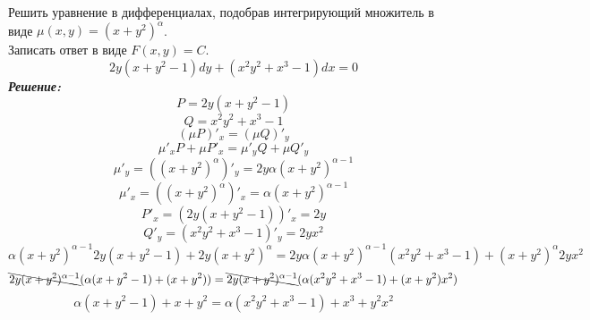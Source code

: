 \documentclass[a5paper, 10pt]{article}
\theoremstyle{definition}
\theoremstyle{plain}
\theoremstyle{remark}
\begin{document}
\newpage
\section{}
Решить уравнение в дифференциалах, подобрав интегрирующий множитель в виде $\mu (x, y) = (x+y^2)^{\alpha}$.\\
Записать ответ в виде $F(x, y) = C$.
\begin{equation*}
2y(x + y^2 - 1) dy + (x^2y^2+x^3 - 1)dx = 0
\end{equation*}
\textit{\textbf{Решение:}}\\
\begin{equation*}
P = 2y(x + y^2 - 1) 
\end{equation*}
\begin{equation*}
Q = x^2y^2+x^3 - 1
\end{equation*}
\begin{equation*}
\left( \mu P \right)'_x = \left( \mu Q \right)'_y
\end{equation*}
\begin{equation*}
 \mu'_x P + \mu P'_x = \mu'_y Q  +  \mu Q'_y
\end{equation*}
\begin{equation*}
 \mu'_y =  \left(  (x+y^2)^{\alpha} \right)'_y  = 2y{\alpha} (x+y^2)^{\alpha - 1}
\end{equation*}
\begin{equation*}
 \mu'_x =  \left(  (x+y^2)^{\alpha} \right)'_x  = {\alpha} (x+y^2)^{\alpha - 1}
\end{equation*}
\begin{equation*}
 P'_x =  \left(  2y(x + y^2 - 1)  \right)'_x = 2y
\end{equation*}
\begin{equation*}
 Q'_y=  \left(  x^2y^2+x^3 - 1  \right)'_y = 2yx^2
\end{equation*}
\begin{equation*}
  {\alpha} (x+y^2)^{\alpha - 1}  2y(x + y^2 - 1) + 2y(x+y^2)^{\alpha}  = 2y{\alpha} (x+y^2)^{\alpha - 1} ( x^2y^2+x^3 - 1)  +  (x+y^2)^{\alpha}  2yx^2
\end{equation*}
\begin{equation*}
 \bcancel{ 2y (x+y^2)^{\alpha - 1}} ( {\alpha}(x + y^2 - 1) +(x+y^2)) =  \bcancel{ 2y (x+y^2)^{\alpha - 1}}({\alpha} ( x^2y^2+x^3 - 1)  +  (x+y^2)x^2)
\end{equation*}
\begin{equation*}
  {\alpha}(x + y^2 - 1) +x+y^2 =  {\alpha} ( x^2y^2+x^3 - 1)  +  x^3+y^2x^2
\end{equation*}
\end{document}
